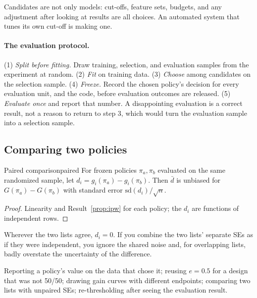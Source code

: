 \documentclass[11pt]{article}
\begin{document}
Candidates are not only models: cut-offs, feature sets, budgets, and any adjustment after looking at results are
all choices. An automated system that tunes its own cut-off is making one.

\paragraph{The evaluation protocol.} (1) \emph{Split before fitting.} Draw training, selection, and evaluation samples
from the experiment at random. (2) \emph{Fit} on training data. (3) \emph{Choose} among candidates on the selection
sample. (4) \emph{Freeze.} Record the chosen policy's decision for every evaluation unit, and the code, before
evaluation outcomes are released. (5) \emph{Evaluate once} and report that number. A disappointing evaluation is a
correct result, not a reason to return to step 3, which would turn the evaluation sample into a selection sample.

\subsection{Comparing two policies}

\begin{prop}{Paired comparison}{paired}
For frozen policies $\pi_a, \pi_b$ evaluated on the same randomized sample, let $d_i = g_i(\pi_a) - g_i(\pi_b)$. Then
$\bar d$ is unbiased for $G(\pi_a) - G(\pi_b)$ with standard error $\text{sd}(d_i)/\sqrt n$.
\end{prop}
\begin{proof}
Linearity and Result~\ref{prop:ipw} for each policy; the $d_i$ are functions of independent rows.
\end{proof}

Wherever the two lists agree, $d_i = 0$. If you combine the two lists' separate SEs as if they were independent, you
ignore the shared noise and, for overlapping lists, badly overstate the uncertainty of the difference.

\begin{pitfall}
Reporting a policy's value on the data that chose it; reusing $e = 0.5$ for a design that was not 50/50; drawing
gain curves with different endpoints; comparing two lists with unpaired SEs; re-thresholding after seeing the
evaluation result.
\end{pitfall}

\sectiontwo
\end{document}
